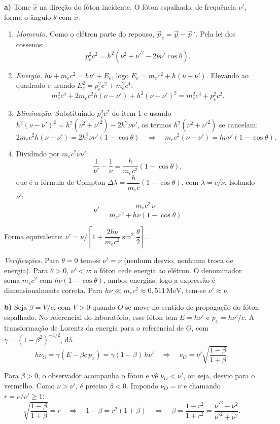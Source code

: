 \documentclass{article}%
\begin{document}
\textbf{a)} Tome $\hat{x}$ na direção do fóton incidente. O fóton espalhado, de frequência $\nu'$, forma o ângulo $\theta$ com $\hat{x}$.

\begin{enumerate}
\item \textit{Momento.} Como o elétron parte do repouso, $\vec{p}_e=\vec{p}-\vec{p}\,'$. Pela lei dos cossenos:
\[ p_e^2c^2=h^2\left(\nu^2+\nu'^2-2\nu\nu'\cos\theta\right). \]
\item \textit{Energia.} $h\nu+m_ec^2=h\nu'+E_e$, logo $E_e=m_ec^2+h(\nu-\nu')$. Elevando ao quadrado e usando $E_e^2=p_e^2c^2+m_e^2c^4$:
\[ m_e^2c^4+2m_ec^2h(\nu-\nu')+h^2(\nu-\nu')^2=m_e^2c^4+p_e^2c^2. \]
\item \textit{Eliminação.} Substituindo $p_e^2c^2$ do item 1 e usando $h^2(\nu-\nu')^2=h^2(\nu^2+\nu'^2)-2h^2\nu\nu'$, os termos $h^2(\nu^2+\nu'^2)$ se cancelam:
\[ 2m_ec^2h(\nu-\nu')=2h^2\nu\nu'(1-\cos\theta)\quad\Rightarrow\quad m_ec^2(\nu-\nu')=h\nu\nu'(1-\cos\theta). \]
\item Dividindo por $m_ec^2\nu\nu'$:
\[ \frac{1}{\nu'}-\frac{1}{\nu}=\frac{h}{m_ec^2}(1-\cos\theta), \]
que é a fórmula de Compton $\Delta\lambda=\dfrac{h}{m_ec}(1-\cos\theta)$, com $\lambda=c/\nu$. Isolando $\nu'$:
\[ \boxed{\nu'=\frac{m_ec^2\,\nu}{m_ec^2+h\nu(1-\cos\theta)}} \]
\end{enumerate}

Forma equivalente: $\nu'=\nu\big/\!\left[1+\dfrac{2h\nu}{m_ec^2}\sin^2\dfrac{\theta}{2}\right]$.

\textit{Verificações.} Para $\theta=0$ tem-se $\nu'=\nu$ (nenhum desvio, nenhuma troca de energia). Para $\theta>0$, $\nu'<\nu$: o fóton cede energia ao elétron. O denominador soma $m_ec^2$ com $h\nu(1-\cos\theta)$, ambos energias, logo a expressão é dimensionalmente correta. Para $h\nu\ll m_ec^2\approx 0,511\,\mathrm{MeV}$, tem-se $\nu'\approx\nu$.

\textbf{b)} Seja $\beta=V/c$, com $V>0$ quando $O$ se move no sentido de propagação do fóton espalhado. No referencial do laboratório, esse fóton tem $E=h\nu'$ e $p_x=h\nu'/c$. A transformação de Lorentz da energia para o referencial de $O$, com $\gamma=(1-\beta^2)^{-1/2}$, dá
\[ h\nu_O=\gamma\left(E-\beta c\,p_x\right)=\gamma(1-\beta)\,h\nu'\quad\Rightarrow\quad \nu_O=\nu'\sqrt{\frac{1-\beta}{1+\beta}}. \]

Para $\beta>0$, o observador acompanha o fóton e vê $\nu_O<\nu'$, ou seja, desvio para o vermelho. Como $\nu>\nu'$, é preciso $\beta<0$. Impondo $\nu_O=\nu$ e chamando $r=\nu/\nu'\ge 1$:
\[ \sqrt{\frac{1-\beta}{1+\beta}}=r\quad\Rightarrow\quad 1-\beta=r^2(1+\beta)\quad\Rightarrow\quad \beta=\frac{1-r^2}{1+r^2}=\frac{\nu'^2-\nu^2}{\nu'^2+\nu^2}. \]
\end{document}

